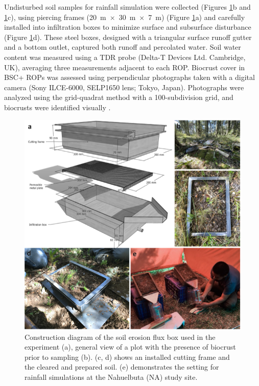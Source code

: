 Undisturbed soil samples for rainfall simulation were collected (Figures \ref{fig:sampling-panel}b and \ref{fig:sampling-panel}c), using piercing frames (\SI{20}{\meter}~$\times$~\SI{30}{\meter}~$\times$~\SI{7}{\meter}) (Figure \ref{fig:sampling-panel}a) and carefully installed into infiltration boxes to minimize surface and subsurface disturbance (Figure \ref{fig:sampling-panel}d). These steel boxes, designed with a triangular surface runoff gutter and a bottom outlet, captured both runoff and percolated water. Soil water content was measured using a TDR probe (Delta-T Devices Ltd. Cambridge, UK), averaging three measurements adjacent to each ROP. Biocrust cover in BSC+ ROPs was assessed using perpendicular photographs taken with a digital camera (Sony ILCE-6000, SELP1650 lens; Tokyo, Japan). Photographs were analyzed using the grid-quadrat method with a 100-subdivision grid, and biocrusts were identified visually \citep{Belnap2001}.

\begin{figure}[h!]
	\centering
	\includegraphics[width=1\textwidth]{img/sampling-panel.png}
	\caption[Field experimental setup for soil erosion and rainfall simulation: construction of the flux box, plot preparation, and biocrust evaluation at Nahuelbuta (NA)]{Construction diagram of the soil erosion flux box used in the experiment (a), general view of a plot with the presence of biocrust prior to sampling (b). (c, d) shows an installed cutting frame and the cleared and prepared soil. (e) demonstrates the setting for rainfall simulations at the Nahuelbuta (NA) study site.}
	\label{fig:sampling-panel}
\end{figure}

